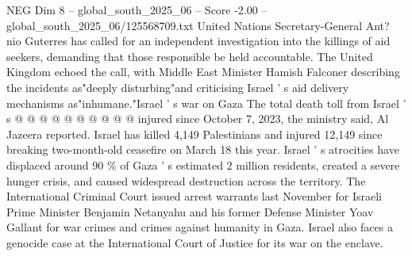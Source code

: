 \begin{textsample}{NEG Dim 8 – global\_south\_2025\_06 – Score -2.00 – global\_south\_2025\_06/125568709.txt}
United Nations Secretary-General Ant? nio Guterres has called for an independent investigation into the killings of aid seekers, demanding that those responsible be held accountable.
The United Kingdom echoed the call, with Middle East Minister Hamish Falconer describing the incidents as"deeply disturbing"and criticising Israel ' s aid delivery mechanisms as"inhumane."Israel ' s war on Gaza The total death toll from Israel ' s @ @ @ @ @ @ @ @ @ @ injured since October 7, 2023, the ministry said, Al Jazeera reported.
Israel has killed 4,149 Palestinians and injured 12,149 since breaking two-month-old ceasefire on March 18 this year.
Israel ' s atrocities have displaced around 90 \% of Gaza ' s estimated 2 million residents, created a severe hunger crisis, and caused widespread destruction across the territory.
The International Criminal Court issued arrest warrants last November for Israeli Prime Minister Benjamin Netanyahu and his former Defense Minister Yoav Gallant for war crimes and crimes against humanity in Gaza.
Israel also faces a genocide case at the International Court of Justice for its war on the enclave.

\end{textsample}
